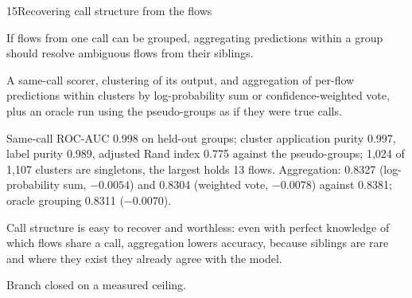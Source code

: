 \begin{explog}{15}{Recovering call structure from the flows}
\item[Hypothesis] If flows from one call can be grouped, aggregating predictions within a group
should resolve ambiguous flows from their siblings.
\item[Method] A same-call scorer, clustering of its output, and aggregation of per-flow
predictions within clusters by log-probability sum or confidence-weighted vote,
plus an oracle run using the pseudo-groups as if they were true calls.
\item[Result] Same-call ROC-AUC 0.998 on held-out groups; cluster application purity 0.997,
label purity 0.989, adjusted Rand index 0.775 against the pseudo-groups; 1{,}024 of
1{,}107 clusters are singletons, the largest holds 13 flows. Aggregation: 0.8327
(log-probability sum, $-0.0054$) and 0.8304 (weighted vote, $-0.0078$) against
0.8381; oracle grouping 0.8311 ($-0.0070$).
\item[Inference] Call structure is easy to recover and worthless: even with perfect knowledge
of which flows share a call, aggregation lowers accuracy, because siblings are rare
and where they exist they already agree with the model.
\item[Verdict] Branch closed on a measured ceiling.
\end{explog}

